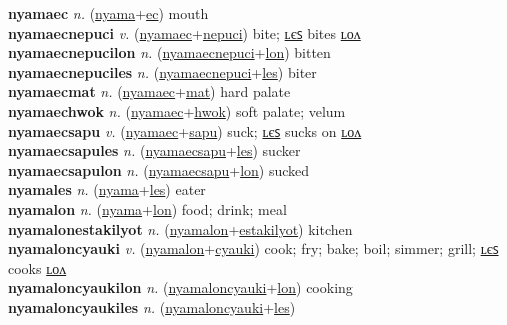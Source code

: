 \textbf{nyamaec} \textit{n.} (\hyperref[nyama]{nyama}+\hyperref[ec]{ec})
mouth \label{nyamaec} \\
\textbf{nyamaecnepuci} \textit{v.} (\hyperref[nyamaec]{nyamaec}+\hyperref[nepuci]{nepuci})
bite; \hyperref[nyamaecnepuciles]{ʟєꜱ} bites \hyperref[nyamaecnepucilon]{ʟᴏᴧ} \label{nyamaecnepuci} \\
\textbf{nyamaecnepucilon} \textit{n.} (\hyperref[nyamaecnepuci]{nyamaecnepuci}+\hyperref[lon]{lon})
bitten \label{nyamaecnepucilon} \\
\textbf{nyamaecnepuciles} \textit{n.} (\hyperref[nyamaecnepuci]{nyamaecnepuci}+\hyperref[les]{les})
biter \label{nyamaecnepuciles} \\
\textbf{nyamaecmat} \textit{n.} (\hyperref[nyamaec]{nyamaec}+\hyperref[mat]{mat})
hard palate \label{nyamaecmat} \\
\textbf{nyamaechwok} \textit{n.} (\hyperref[nyamaec]{nyamaec}+\hyperref[hwok]{hwok})
soft palate; velum \label{nyamaechwok} \\
\textbf{nyamaecsapu} \textit{v.} (\hyperref[nyamaec]{nyamaec}+\hyperref[sapu]{sapu})
suck; \hyperref[nyamaecsapules]{ʟєꜱ} sucks on \hyperref[nyamaecsapulon]{ʟᴏᴧ} \label{nyamaecsapu} \\
\textbf{nyamaecsapules} \textit{n.} (\hyperref[nyamaecsapu]{nyamaecsapu}+\hyperref[les]{les})
sucker \label{nyamaecsapules} \\
\textbf{nyamaecsapulon} \textit{n.} (\hyperref[nyamaecsapu]{nyamaecsapu}+\hyperref[lon]{lon})
sucked \label{nyamaecsapulon} \\
\textbf{nyamales} \textit{n.} (\hyperref[nyama]{nyama}+\hyperref[les]{les})
eater \label{nyamales} \\
\textbf{nyamalon} \textit{n.} (\hyperref[nyama]{nyama}+\hyperref[lon]{lon})
food; drink; meal \label{nyamalon} \\
\textbf{nyamalonestakilyot} \textit{n.} (\hyperref[nyamalon]{nyamalon}+\hyperref[estakilyot]{estakilyot})
kitchen \label{nyamalonestakilyot} \\
\textbf{nyamaloncyauki} \textit{v.} (\hyperref[nyamalon]{nyamalon}+\hyperref[cyauki]{cyauki})
cook; fry; bake; boil; simmer; grill; \hyperref[nyamaloncyaukiles]{ʟєꜱ} cooks \hyperref[nyamaloncyaukilon]{ʟᴏᴧ} \label{nyamaloncyauki} \\
\textbf{nyamaloncyaukilon} \textit{n.} (\hyperref[nyamaloncyauki]{nyamaloncyauki}+\hyperref[lon]{lon})
cooking \label{nyamaloncyaukilon} \\
\textbf{nyamaloncyaukiles} \textit{n.} (\hyperref[nyamaloncyauki]{nyamaloncyauki}+\hyperref[les]{les})
